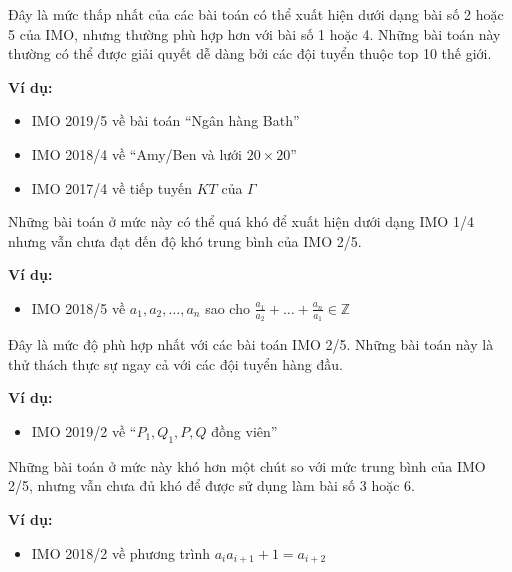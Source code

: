 \documentclass[../imo-training-open-book.tex]{subfiles}
\begin{document}
\begin{definition*}[15M] \label{definition:15M}
    Đây là mức thấp nhất của các bài toán có thể xuất hiện dưới dạng bài số 2 hoặc 5 của IMO, nhưng thường phù hợp hơn với bài số 1 hoặc 4.
    Những bài toán này thường có thể được giải quyết dễ dàng bởi các đội tuyển thuộc top 10 thế giới.

    \textbf{Ví dụ:}
    \begin{itemize}[topsep=0pt, partopsep=0pt, itemsep=0pt]
        \item IMO 2019/5 về bài toán ``Ngân hàng Bath''
        \item IMO 2018/4 về ``Amy/Ben và lưới $20 \times 20$''
        \item IMO 2017/4 về tiếp tuyến $KT$ của $\Gamma$
    \end{itemize}
\end{definition*}

\begin{definition*}[20M] \label{definition:20M}
    Những bài toán ở mức này có thể quá khó để xuất hiện dưới dạng IMO 1/4 nhưng vẫn chưa đạt đến độ khó trung bình của IMO 2/5.

    \textbf{Ví dụ:}
    \begin{itemize}[topsep=0pt, partopsep=0pt, itemsep=0pt]
        \item IMO 2018/5 về $a_1, a_2, \dots, a_n$ sao cho $\frac{a_1}{a_2} + \dots + \frac{a_n}{a_1} \in \mathbb{Z}$
    \end{itemize}
\end{definition*}

\begin{definition*}[25M] \label{definition:25M}
    Đây là mức độ phù hợp nhất với các bài toán IMO 2/5. Những bài toán này là thử thách thực sự ngay cả với các đội tuyển hàng đầu.

    \textbf{Ví dụ:}
    \begin{itemize}[topsep=0pt, partopsep=0pt, itemsep=0pt]
        \item IMO 2019/2 về ``$P_1, Q_1, P, Q$ đồng viên''
    \end{itemize}
\end{definition*}

\begin{definition*}[30M] \label{definition:30M}
    Những bài toán ở mức này khó hơn một chút so với mức trung bình của IMO 2/5, nhưng vẫn chưa đủ khó để được sử dụng làm bài số 3 hoặc 6.

    \textbf{Ví dụ:}
    \begin{itemize}[topsep=0pt, partopsep=0pt, itemsep=0pt]
        \item IMO 2018/2 về phương trình $a_i a_{i+1} + 1 = a_{i+2}$
    \end{itemize}
\end{definition*}
\end{document}
